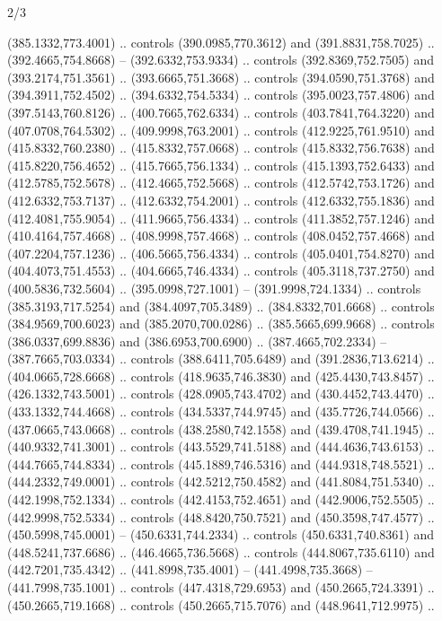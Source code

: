\begin{flagdescription}{2/3}
\begin{scope}[xshift=0.5\flaglength,yshift=0.5\flagwidth,scale=\flagwidth/525.28]
\begin{scope}[y=0.1mm, x=0.1mm, yscale=-1,shift={(-381.5,-404)}]
\begin{scope}[shift={(5.25001,4.53053)},miter limit=4.00,line width=0.800\lw]
  (385.1332,773.4001) .. controls (390.0985,770.3612) and (391.8831,758.7025) ..
  (392.4665,754.8668) -- (392.6332,753.9334) .. controls (392.8369,752.7505) and
  (393.2174,751.3561) .. (393.6665,751.3668) .. controls (394.0590,751.3768) and
  (394.3911,752.4502) .. (394.6332,754.5334) .. controls (395.0023,757.4806) and
  (397.5143,760.8126) .. (400.7665,762.6334) .. controls (403.7841,764.3220) and
  (407.0708,764.5302) .. (409.9998,763.2001) .. controls (412.9225,761.9510) and
  (415.8332,760.2380) .. (415.8332,757.0668) .. controls (415.8332,756.7638) and
  (415.8220,756.4652) .. (415.7665,756.1334) .. controls (415.1393,752.6433) and
  (412.5785,752.5678) .. (412.4665,752.5668) .. controls (412.5742,753.1726) and
  (412.6332,753.7137) .. (412.6332,754.2001) .. controls (412.6332,755.1836) and
  (412.4081,755.9054) .. (411.9665,756.4334) .. controls (411.3852,757.1246) and
  (410.4164,757.4668) .. (408.9998,757.4668) .. controls (408.0452,757.4668) and
  (407.2204,757.1236) .. (406.5665,756.4334) .. controls (405.0401,754.8270) and
  (404.4073,751.4553) .. (404.6665,746.4334) .. controls (405.3118,737.2750) and
  (400.5836,732.5604) .. (395.0998,727.1001) -- (391.9998,724.1334) .. controls
  (385.3193,717.5254) and (384.4097,705.3489) .. (384.8332,701.6668) .. controls
  (384.9569,700.6023) and (385.2070,700.0286) .. (385.5665,699.9668) .. controls
  (386.0337,699.8836) and (386.6953,700.6900) .. (387.4665,702.2334) --
  (387.7665,703.0334) .. controls (388.6411,705.6489) and (391.2836,713.6214) ..
  (404.0665,728.6668) .. controls (418.9635,746.3830) and (425.4430,743.8457) ..
  (426.1332,743.5001) .. controls (428.0905,743.4702) and (430.4452,743.4470) ..
  (433.1332,744.4668) .. controls (434.5337,744.9745) and (435.7726,744.0566) ..
  (437.0665,743.0668) .. controls (438.2580,742.1558) and (439.4708,741.1945) ..
  (440.9332,741.3001) .. controls (443.5529,741.5188) and (444.4636,743.6153) ..
  (444.7665,744.8334) .. controls (445.1889,746.5316) and (444.9318,748.5521) ..
  (444.2332,749.0001) .. controls (442.5212,750.4582) and (441.8084,751.5340) ..
  (442.1998,752.1334) .. controls (442.4153,752.4651) and (442.9006,752.5505) ..
  (442.9998,752.5334) .. controls (448.8420,750.7521) and (450.3598,747.4577) ..
  (450.5998,745.0001) -- (450.6331,744.2334) .. controls (450.6331,740.8361) and
  (448.5241,737.6686) .. (446.4665,736.5668) .. controls (444.8067,735.6110) and
  (442.7201,735.4342) .. (441.8998,735.4001) -- (441.4998,735.3668) --
  (441.7998,735.1001) .. controls (447.4318,729.6953) and (450.2665,724.3391) ..
  (450.2665,719.1668) .. controls (450.2665,715.7076) and (448.9641,712.9975) ..

\end{scope}
\end{scope}
\end{scope}
\end{flagdescription}
